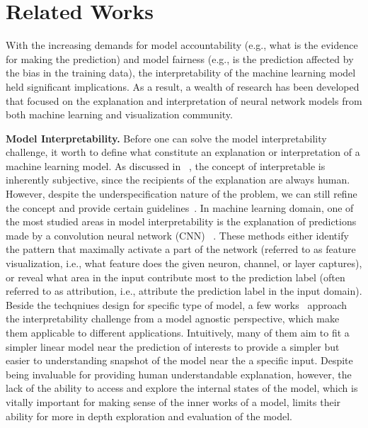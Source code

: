 
\section{Related Works}
With the increasing demands for model accountability (e.g., what is the evidence for making the prediction) and model fairness (e.g., is the prediction affected by the bias in the training data),
the interpretability of the machine learning model held significant implications. As a result, a wealth of research has been developed that focused on the explanation and interpretation of neural network models from both machine learning and visualization community.

\textbf{Model Interpretability.}
Before one can solve the model interpretability challenge, it worth to define what constitute an explanation or interpretation of a machine learning model.
As discussed in ~\cite{Lipton2016, Doshi-Velez2017}, the concept of interpretable is inherently subjective, since the recipients of the explanation are always human.
However, despite the underspecification nature of the problem, we can still refine the concept and provide certain guidelines~\cite{Doshi-Velez2017}.
In machine learning domain, one of the most studied areas in model interpretability is the explanation of predictions made by a convolution neural network (CNN) ~\cite{SimonyanVedaldiZisserman2013, ZeilerFergus2014, YosinskiCluneNguyen2015,OlahMordvintsevSchubert2017, OlahSatyanarayanJohnson2018}.
%
These methods either identify the pattern that maximally activate a part of the network (referred to as feature visualization, i.e., what feature does the given neuron, channel, or layer captures), or reveal what area in the input contribute most to the prediction label (often referred to as attribution, i.e., attribute the prediction label in the input domain).
%
Beside the techqniues design for specific type of model, a few works~\cite{RibeiroSinghGuestrin2016, KrausePererNg2016} approach the interpretability challenge from a model agnostic perspective, which make them applicable to different applications. Intuitively, many of them aim to fit a simpler linear model near the prediction of interests to provide a simpler but easier to understanding snapshot of the model near the a specific input.
%
Despite being invaluable for providing human understandable explanation, however, the lack of the ability to access and explore the internal states of the model, which is vitally important for making sense of the inner works of a model, limits their ability for more in depth exploration and evaluation of the model.

